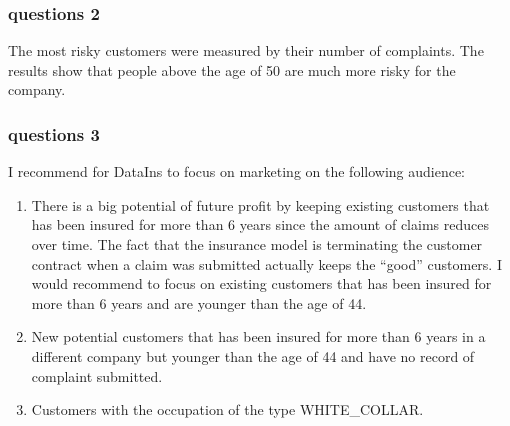 \documentclass[]{article}
\begin{document}
\subsubsection{questions 2}\label{questions-2}

The most risky customers were measured by their number of complaints.
The results show that people above the age of 50 are much more risky for
the company.

\subsubsection{questions 3}\label{questions-3}

I recommend for DataIns to focus on marketing on the following audience:

\begin{enumerate}
\def\labelenumi{\arabic{enumi}.}
\item
  There is a big potential of future profit by keeping existing
  customers that has been insured for more than 6 years since the amount
  of claims reduces over time. The fact that the insurance model is
  terminating the customer contract when a claim was submitted actually
  keeps the ``good'' customers. I would recommend to focus on existing
  customers that has been insured for more than 6 years and are younger
  than the age of 44.
\item
  New potential customers that has been insured for more than 6 years in
  a different company but younger than the age of 44 and have no record
  of complaint submitted.
\item
  Customers with the occupation of the type WHITE\_COLLAR.
\end{enumerate}
\end{document}
